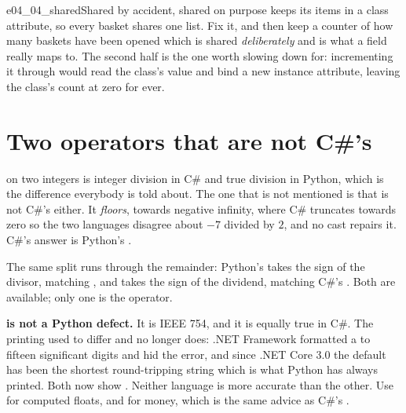 
\begin{exercise}{e04_04_shared}{Shared by accident, shared on purpose}
 keeps its items in a class attribute, so every basket shares
one list. Fix it, and then keep a counter of how many baskets have been
opened \dash{} which is shared \emph{deliberately} and is what a
 field really maps to. The second half is the one worth
slowing down for: incrementing it through  would read the
class's value and bind a new instance attribute, leaving the class's count
at zero for ever.
\end{exercise}

\section{Two operators that are not C\#'s}
\label{sec:ch04-arithmetic}

\code{/} on two integers is integer division in C\# and true division in
Python, which is the difference everybody is told about. The one that is
not mentioned is that \code{//} is not C\#'s \code{/} either. It
\emph{floors}, towards negative infinity, where C\# truncates towards zero
\dash{} so the two languages disagree about $-7$ divided by $2$, and no
cast repairs it. C\#'s answer is Python's .



\noindent
The same split runs through the remainder: Python's \code{\%} takes the
sign of the divisor, matching \code{//}, and  takes the sign
of the dividend, matching C\#'s \code{\%}. Both are available; only one is
the operator.

\begin{trapbox}
\textbf{ is not a Python defect.} It is IEEE 754,
and it is equally true in C\#. The printing used to differ and no longer
does: .NET Framework formatted a  to fifteen significant
digits and hid the error, and since .NET Core 3.0 the default has been the
shortest round-tripping string \dash{} which is what Python has always
printed. Both now show . Neither language is more
accurate than the other. Use  for computed floats, and
 for money, which is the same advice as C\#'s
.
\end{trapbox}

